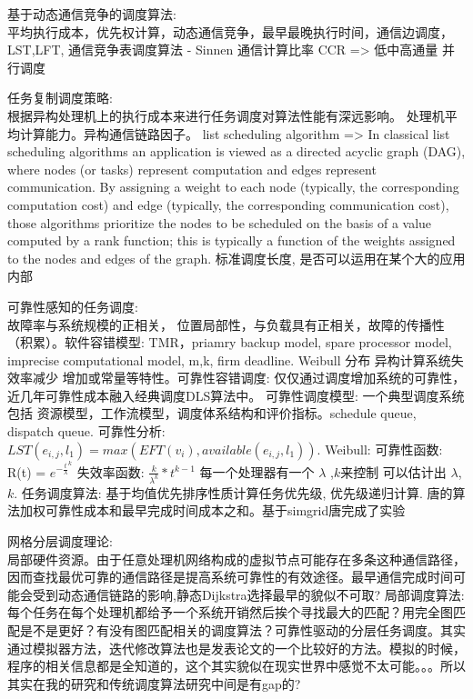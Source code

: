 \documentclass[UTF8]{article}
\begin{document}
基于动态通信竞争的调度算法:\\平均执行成本，优先权计算，动态通信竞争，最早最晚执行时间，通信边调度，LST,LFT, 通信竞争表调度算法 - Sinnen 通信计算比率 CCR => 低中高通量 并行调度 

任务复制调度策略: \\ \cite{zhao2003experimental} 根据异构处理机上的执行成本来进行任务调度对算法性能有深远影响。 处理机平均计算能力。异构通信链路因子。 list scheduling algorithm => In classical list scheduling algorithms an application is viewed as a directed acyclic graph (DAG), where nodes (or tasks) represent
computation and edges represent communication. By assigning a weight to each node (typically, the corresponding computation cost) and edge (typically, the
corresponding communication cost), those algorithms prioritize the nodes to be scheduled on the basis of a value computed by a rank function; this is typically a function of the weights assigned to the nodes and edges of the graph.  标准调度长度,  是否可以运用在某个大的应用内部

可靠性感知的任务调度:\\ 故障率与系统规模的正相关， 位置局部性，与负载具有正相关，故障的传播性（积累）。软件容错模型: TMR，priamry backup model, spare processor model, imprecise computational model, m,k, firm deadline. Weibull 分布 异构计算系统失效率减少 增加或常量等特性。可靠性容错调度: 仅仅通过调度增加系统的可靠性，近几年可靠性成本融入经典调度DLS算法中。 可靠性调度模型: 一个典型调度系统包括 资源模型，工作流模型，调度体系结构和评价指标。schedule queue, dispatch queue. 可靠性分析: $LST(e_{i,j},l_1) = max(EFT(v_i), available(e_{i,j}, l_1))$. Weibull: 可靠性函数: R(t) = $e^{{-\frac{t}{\lambda}}^k}$ 失效率函数: $\frac{k}{\lambda^k}*t^{k - 1}$ 每一个处理器有一个 $\lambda$ ,$k$来控制 \cite{murthy2004weibull} 可以估计出 $\lambda$,$k$.  任务调度算法: 基于均值优先排序性质计算任务优先级, 优先级递归计算. 唐的算法加权可靠性成本和最早完成时间成本之和。基于simgrid唐完成了实验

网格分层调度理论:\\局部硬件资源。由于任意处理机网络构成的虚拟节点可能存在多条这种通信路径，因而查找最优可靠的通信路径是提高系统可靠性的有效途径。最早通信完成时间可能会受到动态通信链路的影响,静态Dijkstra选择最早的貌似不可取?  局部调度算法: 每个任务在每个处理机都给予一个系统开销然后挨个寻找最大的匹配？用完全图匹配是不是更好？有没有图匹配相关的调度算法？可靠性驱动的分层任务调度。其实通过模拟器方法，迭代修改算法也是发表论文的一个比较好的方法。模拟的时候，程序的相关信息都是全知道的，这个其实貌似在现实世界中感觉不太可能。。。所以其实在我的研究和传统调度算法研究中间是有gap的?
\end{document}

